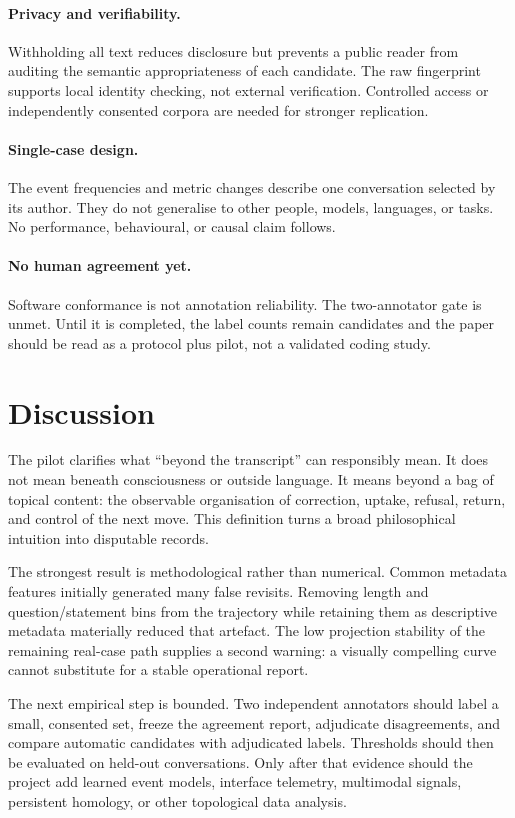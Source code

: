 \documentclass[11pt]{article}
\begin{document}
\paragraph{Privacy and verifiability.}
Withholding all text reduces disclosure but prevents a public reader from
auditing the semantic appropriateness of each candidate. The raw fingerprint
supports local identity checking, not external verification. Controlled access
or independently consented corpora are needed for stronger replication.

\paragraph{Single-case design.}
The event frequencies and metric changes describe one conversation selected by
its author. They do not generalise to other people, models, languages, or tasks.
No performance, behavioural, or causal claim follows.

\paragraph{No human agreement yet.}
Software conformance is not annotation reliability. The two-annotator gate is
unmet. Until it is completed, the label counts remain candidates and the paper
should be read as a protocol plus pilot, not a validated coding study.

\section{Discussion}

The pilot clarifies what ``beyond the transcript'' can responsibly mean. It
does not mean beneath consciousness or outside language. It means beyond a
bag of topical content: the observable organisation of correction, uptake,
refusal, return, and control of the next move. This definition turns a broad
philosophical intuition into disputable records.

The strongest result is methodological rather than numerical. Common metadata
features initially generated many false revisits. Removing length and
question/statement bins from the trajectory while retaining them as descriptive
metadata materially reduced that artefact. The low projection stability of the
remaining real-case path supplies a second warning: a visually compelling
curve cannot substitute for a stable operational report.

The next empirical step is bounded. Two independent annotators should label a
small, consented set, freeze the agreement report, adjudicate disagreements,
and compare automatic candidates with adjudicated labels. Thresholds should
then be evaluated on held-out conversations. Only after that evidence should
the project add learned event models, interface telemetry, multimodal signals,
persistent homology, or other topological data analysis.
\end{document}
